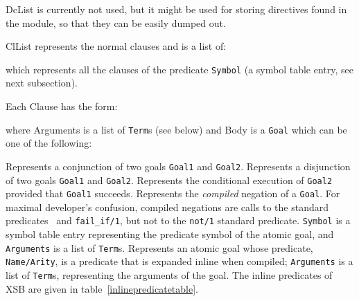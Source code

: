 {\sf DcList} is currently not used, but it might be used for storing
directives found in the module, so that they can be easily dumped out.

{\sf ClList} represents the normal clauses and is a list of:


which represents all the clauses of the predicate {\tt Symbol}
(a symbol table entry, see next subsection).

Each {\sf Clause} has the form:


where {\sf Arguments} is a list of {\tt Term}s (see below) and {\sf Body}
is a {\tt Goal} which can be one of the following:

\begin{description}
	Represents a conjunction of two goals {\tt Goal1} and {\tt Goal2}.
	Represents a disjunction of two goals {\tt Goal1} and {\tt Goal2}.
	Represents the conditional execution of {\tt Goal2} provided
	that {\tt Goal1} succeeds.
	Represents the {\em compiled} negation of a {\tt Goal}.
 	For maximal developer's confusion, compiled negations are calls
	to the standard predicates \not\ and {\tt fail\_if/1}, but not
	to the {\tt not/1} standard predicate.
	{\tt Symbol} is a symbol table entry representing the predicate
	symbol of the atomic goal, and {\tt Arguments} is a list of
	{\tt Term}s.
	Represents an atomic goal whose predicate, {\tt Name/Arity},
	is a predicate that is expanded inline when compiled;
	{\tt Arguments} is a list of {\tt Term}s, representing the
	arguments of the goal.  The inline predicates of XSB are given
	in table~\ref{inlinepredicatetable}.
\end{description}

\begin{table}[htbp]
\caption{The Inline Predicates of XSB}\label{inlinepredicatetable}
\end{table}

